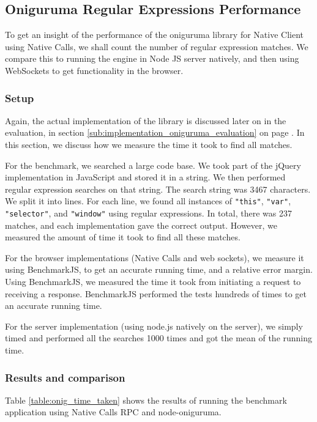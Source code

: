 


\subsection{Oniguruma Regular Expressions Performance} %
\label{sub:oniguruma_regular_expressions_performance}
To get an insight of the performance of the oniguruma library for Native Client using Native Calls, we shall count the number of regular expression matches. We compare this to running the engine in Node JS server natively, and then using WebSockets to get functionality in the browser.

\subsubsection{Setup} %
\label{ssub:onig_performance_setup}
Again, the actual implementation of the library is discussed later on in the evaluation, in section \ref{sub:implementation_oniguruma_evaluation} on page \pageref{sub:implementation_oniguruma_evaluation}. In this section, we discuss how we measure the time it took to find all matches.

For the benchmark, we searched a large code base. We took part of the jQuery implementation in JavaScript and stored it in a string. We then performed regular expression searches on that string. The search string was 3467 characters. We split it into lines. For each line, we found all instances of \lstinline{"this"}, \lstinline{"var"}, \lstinline{"selector"}, and \lstinline{"window"} using regular expressions. In total, there was 237 matches, and each implementation gave the correct output. However, we measured the amount of time it took to find all these matches.

For the browser implementations (Native Calls and web sockets), we measure it using BenchmarkJS, to get an accurate running time, and a relative error margin. Using BenchmarkJS, we measured the time it took from initiating a request to receiving a response. BenchmarkJS performed the tests hundreds of times to get an accurate running time.

For the server implementation (using node.js natively on the server), we simply timed and performed all the searches 1000 times and got the mean of the running time.

\subsubsection{Results and comparison} %
\label{ssub:onig_results_and_comparison}
Table \ref{table:onig_time_taken} shows the results of running the benchmark application using Native Calls RPC and node-oniguruma.

